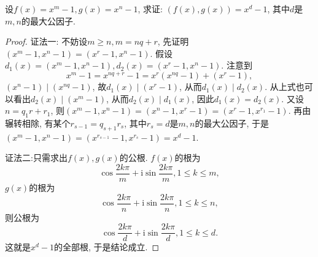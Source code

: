 \documentclass[../../main.tex]{subfiles}
\begin{document}
\begin{proposition}\label{proposition:n方差的最大公因式}
设\(f(x)=x^m - 1, g(x)=x^n - 1\), 求证: \((f(x),g(x))=x^d - 1\), 其中\(d\)是\(m,n\)的最大公因子.
\end{proposition}
\begin{proof}
{\color{blue}证法一:}
不妨设\(m\geqslant  n, m = nq + r\), 先证明\((x^m - 1,x^n - 1)=(x^r - 1,x^n - 1)\). 假设\(d_1(x)=(x^m - 1,x^n - 1), d_2(x)=(x^r - 1,x^n - 1)\). 注意到
\[
x^m - 1=x^{nq + r}-1=x^r(x^{nq}-1)+(x^r - 1),
\]
\((x^n - 1)\mid(x^{nq}-1)\), 故\(d_1(x)\mid(x^r - 1)\), 从而\(d_1(x)\mid d_2(x)\). 从上式也可以看出\(d_2(x)\mid(x^m - 1)\), 从而\(d_2(x)\mid d_1(x)\), 因此\(d_1(x)=d_2(x)\). 又设\(n = q_1r + r_1\), 则\((x^m - 1,x^n - 1)=(x^n - 1,x^r - 1)=(x^r - 1,x^{r_1}-1)\). 再由辗转相除, 有某个\(r_{s - 1}=q_{s + 1}r_s\), 其中\(r_s = d\)是\(m,n\)的最大公因子, 于是\((x^m - 1,x^n - 1)=(x^{r_{s - 1}}-1,x^{r_s}-1)=x^d - 1\).

{\color{blue}证法二:}只需求出\(f(x),g(x)\)的公根. \(f(x)\)的根为
\[
\cos\frac{2k\pi}{m}+\mathrm{i}\sin\frac{2k\pi}{m}, 1\leqslant  k\leqslant  m,
\]
\(g(x)\)的根为
\[
\cos\frac{2k\pi}{n}+\mathrm{i}\sin\frac{2k\pi}{n}, 1\leqslant  k\leqslant  n,
\]
则公根为
\[
\cos\frac{2k\pi}{d}+\mathrm{i}\sin\frac{2k\pi}{d}, 1\leqslant  k\leqslant  d.
\]
这就是\(x^d - 1\)的全部根, 于是结论成立.
\end{proof}
\end{document}
